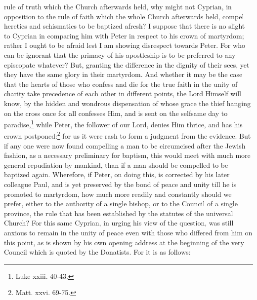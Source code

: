 rule of truth which the Church afterwards held, why might not Cyprian, in opposition to the rule of faith which the whole Church afterwards held, compel heretics and schismatics to be baptized afresh? I suppose that there is no slight to Cyprian in comparing him with Peter in respect to his crown of martyrdom; rather I ought to be afraid lest I am showing disrespect towards Peter. For who can be ignorant that the primacy of his apostleship is to be preferred to any episcopate whatever? But, granting the difference in the dignity of their sees, yet they have the same glory in their martyrdom. And whether it may be the case that the hearts of those who confess and die for the true faith in the unity of charity take precedence of each other in different points, the Lord Himself will know, by the hidden and wondrous dispensation of whose grace the thief hanging on the cross once for all confesses Him, and is sent on the selfsame day to paradise,\footnote{\par  Luke xxiii. 40-43.} while Peter, the follower of our Lord, denies Him thrice, and has his crown postponed:\footnote{\par  Matt. xxvi. 69-75.} for us it were rash to form a judgment from the evidence. But if any one were now found compelling a man to be circumcised after the Jewish fashion, as a necessary preliminary for baptism, this would meet with much more general repudiation by mankind, than if a man should be compelled to be baptized again. Wherefore, if Peter, on doing this, is corrected by his later colleague Paul, and is yet preserved by the bond of peace and unity till he is promoted to martyrdom, how much more readily and constantly should we prefer, either to the authority of a single bishop, or to the Council of a single province, the rule that has been established by the statutes of the universal Church? For this same Cyprian, in urging his view of the question, was still anxious to remain in the unity of peace even with those who differed from him on this point, as is shown by his own opening address at the beginning of the very Council which is quoted by the Donatists. For it is as follows:



